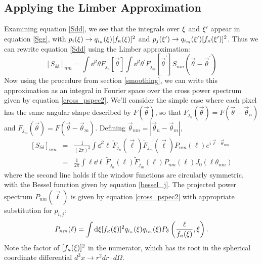 \subsection{Applying the Limber Approximation}
Examining equation \ref{Sdd}, we see that the integrals over $\xi$ and 
$\xi^\prime$ appear in equation \ref{Sgg}, with 
$p_i(\xi)\to q_{i_n}(\xi)[f_\kappa(\xi)]^2$ and 
$p_j(\xi^\prime)\to 
q_{i_m}(\xi^\prime)[f_\kappa(\xi^\prime)]^2$.
Thus we can rewrite equation \ref{Sdd} using the Limber approximation:
\begin{equation}
  \label{Sdd_Limber}
  \left[S_{\delta\delta}\right]_{nm}
  = \int \dd^2\theta F_{j_n}[\vec{\theta}] 
  \int \dd^2\theta^\prime F_{j_m}[\vec{\theta}^\prime] 
  S_{nm}(\vec\theta -\vec\theta^\prime)
\end{equation}
Now using the procedure from section \ref{smoothing}, 
we can write this approximation as an integral in Fourier 
space over the cross power spectrum given by equation
\ref{cross_pspec2}.  We'll consider the simple case where 
each pixel has the same angular shape described by $F(\vec\theta)$,
so that $F_{j_n}(\vec\theta) = F(\vec\theta-\vec\theta_n)$ and
$F_{j_m}(\vec\theta) = F(\vec\theta-\vec\theta_m)$.  Defining
$\vec\theta_{nm} = |\vec\theta_n - \vec\theta_m|$,
\begin{eqnarray}
  \label{Sdd_final}
  \left[S_{\delta\delta}\right]_{nm} &=& 
  \frac{1}{(2\pi)^2}
  \int \dd^2\ell\, \widetilde{F}_{j_n}(\vec\ell)
  \widetilde{F}_{j_m}(\vec\ell)P_{nm}(\ell)
  e^{i\vec\ell\cdot\vec\theta_{nm}}\nonumber\\
  &=&\frac{1}{2\pi}
  \int \ell\dd\ell\, \widetilde{F}_{j_n}(\ell)
  \widetilde{F}_{j_m}(\ell)P_{nm}(\ell)J_0\left(\ell\theta_{nm}\right)
\end{eqnarray}
where the second line holds if the window functions are circularly symmetric, 
with the Bessel function given by equation \ref{bessel_j}.
The projected power spectrum $P_{nm}(\vec\ell)$ is given by 
equation \ref{cross_pspec2} 
with appropriate substitution for $p_{i,j}$:
\begin{equation}
  P_{nm}(\ell) = \int \mathrm{d}\xi[f_\kappa(\xi)]^2 q_{i_n}(\xi)q_{i_m}(\xi)P_\delta\left(\frac{\ell}{f_\kappa(\xi)},\xi\right).
\end{equation}
Note the factor of $[f_\kappa(\xi)]^2$ in the numerator, which has 
its root in the spherical coordinate differential 
$d^3x \to r^2dr \cdot d\Omega$.

